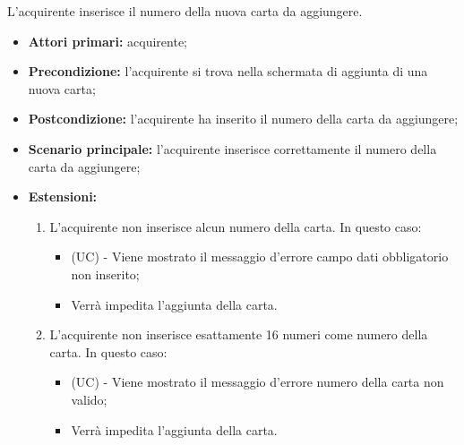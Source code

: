 L'acquirente inserisce il numero della nuova carta da aggiungere.
\begin{itemize}
    \item \textbf{Attori primari:} acquirente;
    \item \textbf{Precondizione:} l'acquirente si trova nella schermata di aggiunta di una nuova carta;
    \item \textbf{Postcondizione:} l'acquirente ha inserito il numero della carta da aggiungere;
    \item \textbf{Scenario principale:} l'acquirente inserisce correttamente il numero della carta da aggiungere;
    \item \textbf{Estensioni:}
    \begin{enumerate}[label=\lett]
        \item L'acquirente non inserisce alcun numero della carta. In questo caso:
        \begin{itemize}
            \item (UC) - Viene mostrato il messaggio d'errore campo dati obbligatorio non inserito;
            \item Verrà impedita l'aggiunta della carta.
        \end{itemize}
        \item L'acquirente non inserisce esattamente 16 numeri come numero della carta. In questo caso:
        \begin{itemize}
            \item (UC) - Viene mostrato il messaggio d'errore numero della carta non valido;
            \item Verrà impedita l'aggiunta della carta.
        \end{itemize}
    \end{enumerate}
\end{itemize}


